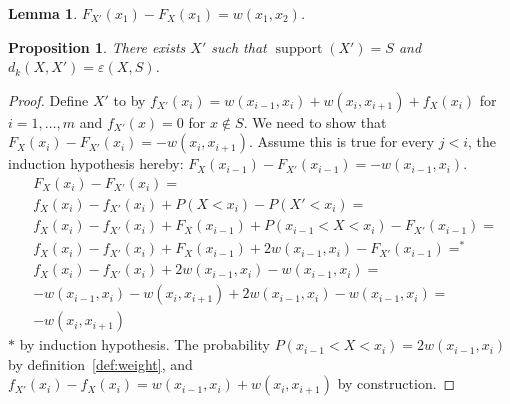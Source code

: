 \documentclass{article}
\newtheorem{lemma}[thm]{Lemma}
\newtheorem{proposition}[thm]{Proposition}
\DeclareMathOperator{\support}{support}
\begin{document}
\begin{lemma}
	$F_{X'}(x_{1})-F_{X}(x_{1}) = w(x_{1}, x_{2})$.
\end{lemma}




\begin{proposition}
	There exists $X'$ such that $\support(X')=S$ and $d_k(X,X') = \varepsilon(X,S)$.
\end{proposition}
\begin{proof}
	Define $X'$ to by $f_{X'}(x_i) = w(x_{i-1},x_i) + w(x_i,x_{i+1}) + f_{X}(x_i)$ for $i=1,\dots,m$ and $f_{X'}(x)=0$ for $x \notin S$.
	We need to show that $F_X(x_i)-F_{X'}(x_i) = -w(x_i, x_{i+1})$. Assume this is true for every $j<i$, the induction hypothesis hereby: $F_X(x_{i-1})-F_{X'}(x_{i-1}) = -w(x_{i-1}, x_{i})$.
	\begin{align*}
		&F_X(x_i)-F_{X'}(x_i) = \\
		&f_{X}(x_i) - f_{X'}(x_i) + P(X<x_i) - P(X'<x_i)  = \\
		&f_{X}(x_i) - f_{X'}(x_i) + F_X(x_{i-1}) + P(x_{i-1}< X < x_i)-F_{X'}(x_{i-1}) = \\
		&f_{X}(x_i) - f_{X'}(x_i) + F_X(x_{i-1}) + 2w(x_{i-1},x_{i})-F_{X'}(x_{i-1}) =^* \\
		&f_{X}(x_i) - f_{X'}(x_i) + 2w(x_{i-1},x_{i}) -w(x_{i-1}, x_{i}) = \\
		& -w(x_{i-1},x_i) - w(x_i,x_{i+1}) + 2w(x_{i-1},x_{i}) -w(x_{i-1}, x_{i}) =\\ 
		&- w(x_i,x_{i+1})
	\end{align*}
	$*$ by induction hypothesis.
	The probability $P(x_{i-1}< X < x_i) = 2w(x_{i-1},x_{i})$ by definition~\ref{def:weight}, and
	$f_{X'}(x_i) - f_{X}(x_i) = w(x_{i-1},x_i) + w(x_i,x_{i+1})$ by construction.
	
\end{proof}
\end{document}
